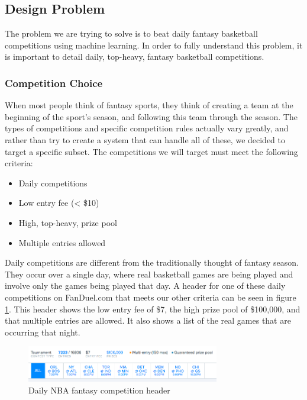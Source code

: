 \subsection{Design Problem}
The problem we are trying to solve is to beat daily fantasy basketball competitions using machine learning. In order to fully understand this problem, it is important to detail daily, top-heavy, fantasy basketball competitions. 
\subsubsection{Competition Choice}
When most people think of fantasy sports, they think of creating a team at the beginning of the sport's season, and following this team through the season. The types of competitions and specific competition rules actually vary greatly, and rather than try to create a system that can handle all of these, we decided to target a specific subset. The competitions we will target must meet the following criteria:
\begin{itemize}
\item Daily competitions
\item Low entry fee (< \$10)
\item High, top-heavy, prize pool
\item Multiple entries allowed
\end{itemize}
Daily competitions are different from the traditionally thought of fantasy season. They occur over a single day, where real basketball games are being played and involve only the games being played that day.
A header for one of these daily competitions on FanDuel.com that meets our other criteria can be seen in figure \ref{fig:comp_header}. This header shows the low entry fee of \$7, the high prize pool of \$100,000, and that multiple entries are allowed. It also shows a list of the real games that are occurring that night.

\begin{figure}[ht]
    \centering
    \includegraphics[width=0.75\textwidth]{figures/fantasy_competition_header}
    \caption{Daily NBA fantasy competition header}
    \label{fig:comp_header}
\end{figure}


